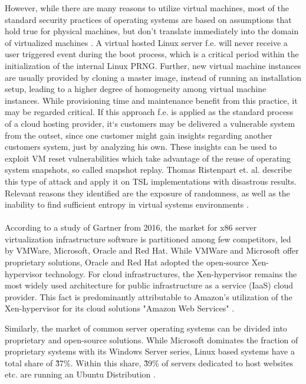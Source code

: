 However, while there are many reasons to utilize virtual machines, most of the standard security practices of operating systems are based on assumptions that hold true for physical machines, but don't translate immediately into the domain of virtualized machines \cite{kerrigan2012study}. A virtual hosted Linux server f.e. will never receive a user triggered event during the boot process, which is a critical period within the initialization of the internal Linux PRNG. Further, new virtual machine instances are usually provided by cloning a master image, instead of running an installation setup, leading to a higher degree of homogeneity among virtual machine instances. While provisioning time and maintenance benefit from this practice, it may be regarded critical. If this approach f.e. is applied as the standard process of a cloud hosting provider, it`s customers may be delivered a vulnerable system from the outset, since one customer might gain insights regarding another customers system, just by analyzing his own. These insights can be used to exploit VM reset vulnerabilities which take advantage of the reuse of  operating system snapshots, so called snapshot replay. Thomas Ristenpart et. al. describe this type of attack and apply it on TSL implementations with disastrous results. Relevant reasons they identified are the exposure of randomness, as well as the inability to find sufficient entropy in virtual systems environments \cite{ristenpart2010good, ristenpart2009hey}. \\~\\
According to a study of Gartner from 2016, the market for x86 server virtualization infrastructure software is partitioned among few competitors, led by VMWare, Microsoft, Oracle and Red Hat. While VMWare and Microsoft offer proprietary solutions, Oracle and Red Hat adopted the open-source Xen-hypervisor technology. For cloud infrastructures, the Xen-hypervisor remains the most widely used architecture for public infrastructure as a service (IaaS) cloud provider. This fact is predominantly attributable to Amazon's utilization of the Xen-hypervisor for its cloud solutions "Amazon Web Services" \cite{bittman2016magic}. 

Similarly, the market of common server operating systems can be divided into proprietary and open-source solutions. While Microsoft dominates the fraction of proprietary systems with its Windows Server series, Linux based systems have a total share of \~37\%. Within this share, \~39\% of servers dedicated to host websites etc. are running an Ubuntu Distribution \cite{statsharelinux} . \\~\\


